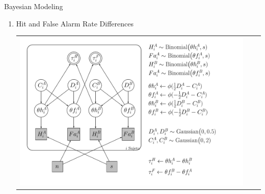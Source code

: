 \documentclass[final]{beamer}
\newlength{\onecolwid}
\newlength{\twocolwid}
\begin{document}
\begin{frame}[t]
\begin{columns}[t]
\begin{column}{\twocolwid}
\begin{columns}[t,totalwidth=\twocolwid]
\begin{column}{\onecolwid}
\begin{alertblock}{Bayesian Modeling}
\begin{enumerate}
$\qquad$


\item Hit and False Alarm Rate Differences
\begin{center}
\begin{tabular}{ccc}
\includegraphics[width=0.8\linewidth]{Figures/Tau_DiffTeta_Model1.pdf}
\end{tabular}
\end{center}



$\quad$
\end{enumerate}

\end{alertblock}


\end{column} %

\end{columns} %



\end{column}
\end{columns}
\end{frame}
\end{document}
